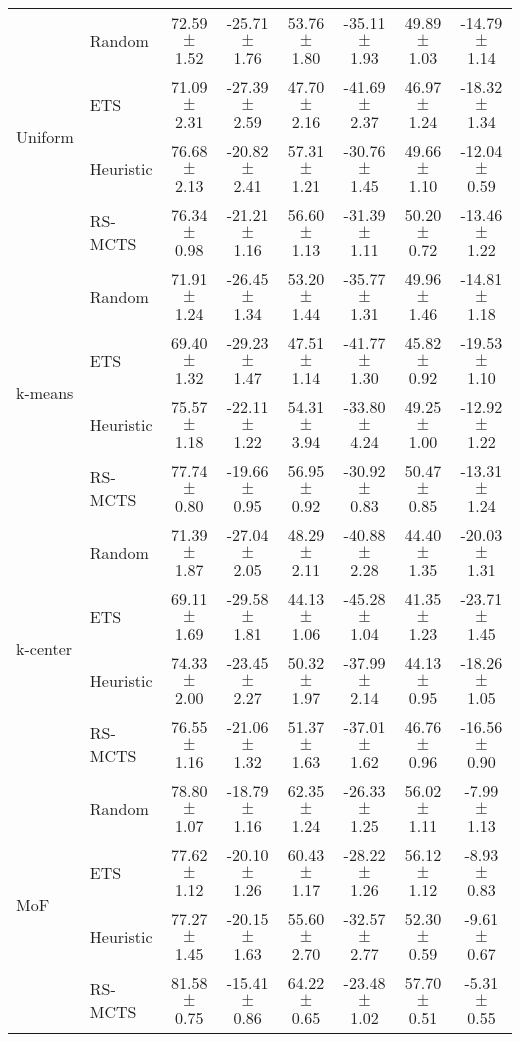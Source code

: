 \begin{tabular}{llcccccc}
	\multirow{4}{*}{Uniform}  & Random  & 72.59 $\pm$ 1.52  & -25.71 $\pm$ 1.76  & 53.76 $\pm$ 1.80   & -35.11 $\pm$ 1.93  & 49.89 $\pm$ 1.03    & -14.79 $\pm$ 1.14    \\
	& ETS     & 71.09 $\pm$ 2.31  & -27.39 $\pm$ 2.59  & 47.70 $\pm$ 2.16   & -41.69 $\pm$ 2.37  & 46.97 $\pm$ 1.24    & -18.32 $\pm$ 1.34    \\
	& Heuristic & 76.68 $\pm$ 2.13  & -20.82 $\pm$ 2.41  & 57.31 $\pm$ 1.21   & -30.76 $\pm$ 1.45  & 49.66 $\pm$ 1.10    & -12.04 $\pm$ 0.59    \\
	& RS-MCTS    & 76.34 $\pm$ 0.98  & -21.21 $\pm$ 1.16  & 56.60 $\pm$ 1.13   & -31.39 $\pm$ 1.11  & 50.20 $\pm$ 0.72    & -13.46 $\pm$ 1.22    \\ \midrule 
	\multirow{4}{*}{k-means}  & Random  & 71.91 $\pm$ 1.24  & -26.45 $\pm$ 1.34  & 53.20 $\pm$ 1.44   & -35.77 $\pm$ 1.31  & 49.96 $\pm$ 1.46    & -14.81 $\pm$ 1.18    \\
	& ETS     & 69.40 $\pm$ 1.32  & -29.23 $\pm$ 1.47  & 47.51 $\pm$ 1.14   & -41.77 $\pm$ 1.30  & 45.82 $\pm$ 0.92    & -19.53 $\pm$ 1.10    \\
	& Heuristic & 75.57 $\pm$ 1.18  & -22.11 $\pm$ 1.22  & 54.31 $\pm$ 3.94   & -33.80 $\pm$ 4.24  & 49.25 $\pm$ 1.00    & -12.92 $\pm$ 1.22    \\
	& RS-MCTS    & 77.74 $\pm$ 0.80  & -19.66 $\pm$ 0.95  & 56.95 $\pm$ 0.92   & -30.92 $\pm$ 0.83  & 50.47 $\pm$ 0.85    & -13.31 $\pm$ 1.24    \\ \midrule 
	\multirow{4}{*}{k-center} & Random  & 71.39 $\pm$ 1.87  & -27.04 $\pm$ 2.05  & 48.29 $\pm$ 2.11   & -40.88 $\pm$ 2.28  & 44.40 $\pm$ 1.35    & -20.03 $\pm$ 1.31    \\
	& ETS     & 69.11 $\pm$ 1.69  & -29.58 $\pm$ 1.81  & 44.13 $\pm$ 1.06   & -45.28 $\pm$ 1.04  & 41.35 $\pm$ 1.23    & -23.71 $\pm$ 1.45    \\
	& Heuristic & 74.33 $\pm$ 2.00  & -23.45 $\pm$ 2.27  & 50.32 $\pm$ 1.97   & -37.99 $\pm$ 2.14  & 44.13 $\pm$ 0.95    & -18.26 $\pm$ 1.05    \\
	& RS-MCTS    & 76.55 $\pm$ 1.16  & -21.06 $\pm$ 1.32  & 51.37 $\pm$ 1.63   & -37.01 $\pm$ 1.62  & 46.76 $\pm$ 0.96    & -16.56 $\pm$ 0.90    \\ \midrule 
	\multirow{4}{*}{MoF}      & Random  & 78.80 $\pm$ 1.07  & -18.79 $\pm$ 1.16  & 62.35 $\pm$ 1.24   & -26.33 $\pm$ 1.25  & 56.02 $\pm$ 1.11    & -7.99 $\pm$ 1.13     \\
	& ETS     & 77.62 $\pm$ 1.12  & -20.10 $\pm$ 1.26  & 60.43 $\pm$ 1.17   & -28.22 $\pm$ 1.26  & 56.12 $\pm$ 1.12    & -8.93 $\pm$ 0.83     \\
	& Heuristic & 77.27 $\pm$ 1.45  & -20.15 $\pm$ 1.63  & 55.60 $\pm$ 2.70   & -32.57 $\pm$ 2.77  & 52.30 $\pm$ 0.59    & -9.61 $\pm$ 0.67     \\
	& RS-MCTS    & 81.58 $\pm$ 0.75  & -15.41 $\pm$ 0.86  & 64.22 $\pm$ 0.65   & -23.48 $\pm$ 1.02  & 57.70 $\pm$ 0.51    & -5.31 $\pm$ 0.55    \\
	\bottomrule
\end{tabular}